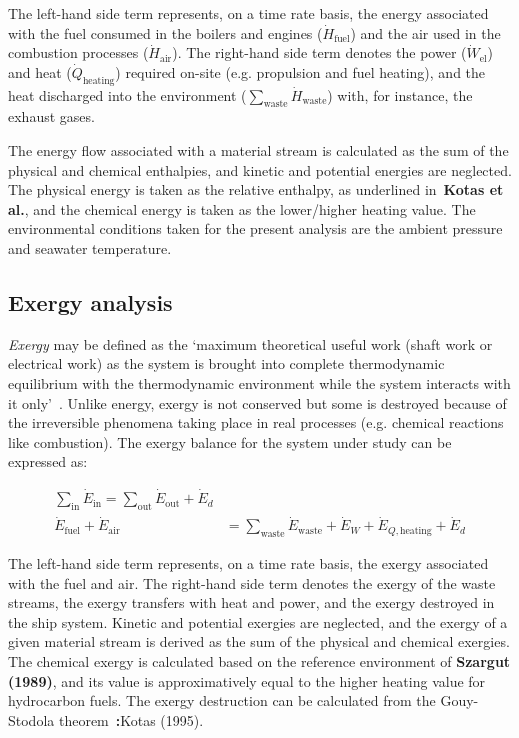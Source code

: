 \documentclass[preprint,12pt]{elsarticle}
\begin{document}
The left-hand side term represents, on a time rate basis, the energy associated with the fuel consumed in the boilers and engines ($\dot{H}_{\mathrm{fuel}}$) and the air used in the combustion processes ($\dot{H}_{\mathrm{air}}$). The right-hand side term denotes the power ($\dot{W}_{\mathrm{el}}$) and heat ($\dot{Q}_{\mathrm{heating}}$) required on-site (e.g. propulsion and fuel heating), and the heat discharged into the environment ($\sum_{{\mathrm{waste}}}\dot{H}_{{\mathrm{waste}}}$) with, for instance, the exhaust gases.

The energy flow associated with a material stream is calculated as the sum of the physical and chemical enthalpies, and kinetic and potential energies are neglected.    The physical energy is taken as the relative enthalpy, as underlined in~\textbf{Kotas et al.}, and the chemical energy is taken as the lower/higher heating value. The environmental conditions taken for the present analysis are the ambient pressure and seawater temperature.

\subsection{Exergy analysis}

\emph{Exergy} may be defined as the `maximum theoretical useful work (shaft work or electrical work) as the system is brought into complete thermodynamic equilibrium with the thermodynamic environment while the system interacts with it only'~\citep{Moran1989}. Unlike energy, exergy is not conserved but some is destroyed because of the irreversible phenomena taking place in real processes (e.g. chemical reactions like combustion). The exergy balance for the system under study can be expressed as:

\begin{align}
	\sum_{\mathrm{in}} \dot{E}_{\mathrm{in}} = \sum_{\mathrm{out}} \dot{E}_{\mathrm{out}} +\dot{E}_{d} \\
	\dot{E}_{\mathrm{fuel}} + \dot{E}_{\mathrm{air}} &= \sum_{{\mathrm{waste}}}\dot{E}_{{\mathrm{waste}}}+\dot{E}_{W}+\dot{E}_{Q,\mathrm{heating}}+\dot{E}_{d} 
\end{align}

The left-hand side term represents, on a time rate basis, the exergy associated with the fuel and air. The right-hand side term denotes the exergy of the waste streams, the exergy transfers with heat and power, and the exergy destroyed in the ship system. Kinetic and potential exergies are neglected, and the exergy of a given material stream is derived as the sum of the physical and chemical exergies. The chemical exergy is calculated based on the reference environment of \textbf{Szargut (1989)}, and its value is approximatively equal to the higher heating value for hydrocarbon fuels. The exergy destruction can be calculated from the Gouy-Stodola theorem~\textbf:{Kotas (1995)}.    
\end{document}
